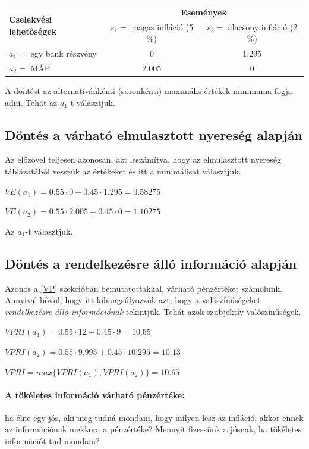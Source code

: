 \documentclass[a4paper,12pt]{article}
\begin{document}
\begin{center}
\begin{tabular}{l|c|c}
\multirow{2}{*}{\bf Cselekvési lehetőségek } &  \multicolumn{2}{c}{ \bf Események }\\
 & $s_1=$ magas infláció (5$\%$) & $s_2=$ alacsony infláció (2$\%$) \\
\hline
  $a_1=$ egy bank részvény & 0 & 1.295 \\
  $a_2=$ MÁP & 2.005 & 0 \\
\end{tabular}
\end{center}

A döntést az alternatívánkénti (soronkénti) maximális értékek minimuma fogja adni. Tehát az $a_1$-t választjuk.

\subsection{Döntés a várható elmulasztott nyereség alapján}
Az előzővel teljesen azonosan, azt leszámítva, hogy az elmulasztott nyereség táblázatából vesszük az értékeket és itt a minimálisat választjuk.

$VE(a_1) = 0.55\cdot 0 + 0.45\cdot 1.295 = 0.58275$

$VE(a_2) = 0.55\cdot 2.005 + 0.45\cdot 0 = 1.10275$

Az $a_1$-t választjuk.

\subsection{Döntés a rendelkezésre álló információ alapján}
Azonos a \ref{VP} szekcióban bemutatottakkal, várható pénzértéket számolunk. Annyival bővül, hogy itt kihangsúlyozzuk azt, hogy a valószínűségeket \emph{rendelkezésre álló információnak} tekintjük. Tehát azok szubjektív valószínűségek.

$VPRI(a_1) = 0.55\cdot 12 + 0.45\cdot 9 = 10.65$

$VPRI(a_2) = 0.55\cdot 9.995 + 0.45\cdot 10.295 = 10.13$

$VPRI = max\{VPRI(a_1), VPRI(a_2)\} = 10.65$

\paragraph{A tökéletes információ várható pénzértéke: } ha élne egy jós, aki meg tudná mondani, hogy milyen lesz az infláció, %
akkor ennek az információnak mekkora a pénzértéke? Mennyit fizessünk a jósnak, ha tökéletes információt tud mondani?
\end{document}
